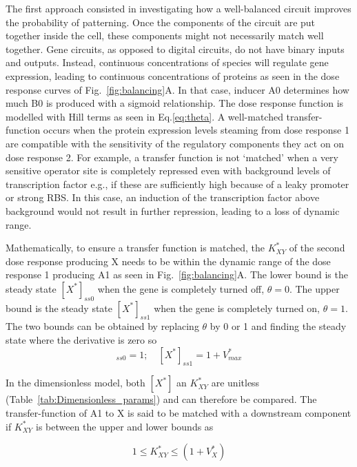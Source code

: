 The first approach consisted in investigating how a well-balanced circuit improves the probability of patterning.
Once the components of the circuit are put together inside the cell, these components might not necessarily match well together.
Gene circuits, as opposed to digital circuits, do not have binary inputs and outputs.
Instead, continuous concentrations of species will regulate gene expression, leading to continuous concentrations of proteins as seen in the dose response curves of Fig.~\ref{fig:balancing}A.
In that case, inducer A0 determines how much B0 is produced with a sigmoid relationship.
The dose response function is modelled with Hill terms as seen in Eq.\ref{eq:theta}.
A well-matched transfer-function occurs when the protein expression levels steaming from dose response 1 are compatible with the sensitivity of the regulatory components they act on on dose response 2.
For example, a transfer function is not ‘matched’ when a very sensitive operator site is completely repressed even with background levels of transcription factor e.g., if these are sufficiently high because of a leaky promoter or strong RBS.
In this case, an induction of the transcription factor above background would not result in further repression, leading to a loss of dynamic range.

Mathematically, to ensure a transfer function is matched, the $K^*_{XY}$ of the second dose response producing X needs to be within the dynamic range of the dose response 1 producing A1 as seen in Fig.~\ref{fig:balancing}A.
The lower bound is the steady state $[X^*]_{ss0}$ when the gene is completely turned off, $\theta=0$.
The upper bound is the steady state $[X^*]_{ss1}$ when the gene is completely turned on, $\theta=1$.
The two bounds can be obtained by replacing $\theta$ by 0 or 1 and finding the steady state where the derivative is zero so
\begin{equation}
    [X^*]_{ss0}=1; \quad [X^*]_{ss1}=1+V^*_{max}
    \label{1toVmax}
\end{equation}


In the dimensionless model, both $[X^*]$ an $K^*_{XY}$ are unitless (Table~\ref{tab:Dimensionless_params}) and can therefore be compared.
The transfer-function of A1 to X is said to be matched with a downstream component if $K^*_{XY}$ is between the upper and lower bounds as

\begin{equation}
    1 \leq K^*_{XY} \leq (1+V^*_{X})
\end{equation}

